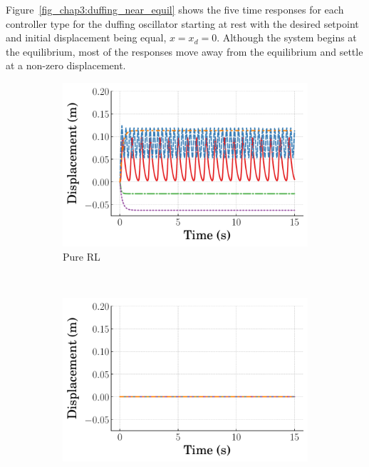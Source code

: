 Figure~\ref{fig_chap3:duffing_near_equil} shows the five time responses for each controller type for the duffing oscillator starting at rest with the desired setpoint and initial displacement being equal, $x=x_d=0$.
Although the system begins at the equilibrium, most of the responses move away from the equilibrium and settle at a non-zero displacement.
%
\begin{figure}[tb]
  \centering
  \begin{subfigure}[b]{0.49\textwidth}
      \centering
      \includegraphics[width=\textwidth]{figures/figures_stability/time_responses_duffing/duffing_pure_RL/Displacement_0_init_10000_steps.pdf}
      \caption{Pure RL}
      \label{subfig_chap3:duffing_pure_RL_near_equil}
  \end{subfigure}\\
  \hfill
  \begin{subfigure}[b]{0.49\textwidth}
    \centering
    \includegraphics[width=\textwidth]{figures/figures_stability/time_responses_duffing/duffing_RL_PD/Displacement_0_init_10000_steps.pdf}

\end{subfigure}
\end{figure}
